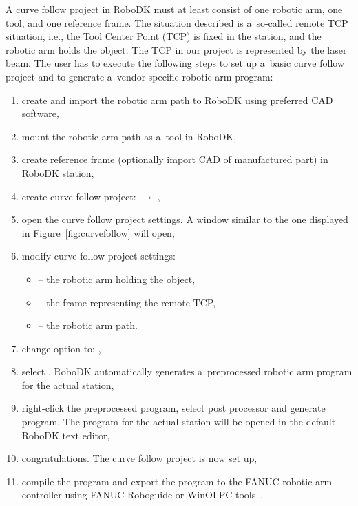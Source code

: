 A curve follow project in RoboDK must at least consist of one robotic arm, one tool, and one reference frame. The situation described is a~so-called remote TCP situation, i.e., the Tool Center Point (TCP) is fixed in the station, and the robotic arm holds the object. The TCP in our project is represented by the laser beam. 
The user has to execute the following steps to set up a~basic curve follow project and to generate a~vendor-specific robotic arm program: 

\begin{enumerate}

\item create and import the robotic arm path to RoboDK using preferred CAD software,

\item mount the robotic arm path as a~tool in RoboDK,

\item create reference frame (optionally import CAD of manufactured part) in RoboDK station, 

\item create curve follow project:  $\rightarrow$ ,

\item open the curve follow project settings. A window similar to the one displayed in Figure~\ref{fig:curvefollow} will open, 

\item modify curve follow project settings:

    \begin{itemize}

        \item {} -- the robotic arm holding the object,
        \item {} -- the frame representing the remote TCP,
        \item {} -- the robotic arm path.
        
    \end{itemize}
    
\item change  option to: ,

\item select . RoboDK automatically generates a~preprocessed robotic arm program for the actual station,

\item right-click the preprocessed program, select post processor and generate program. The  program for the actual station will be opened in the default RoboDK text editor,

\item congratulations. The curve follow project is now set up,

\item compile the program and export the program to the FANUC robotic arm controller using FANUC Roboguide or WinOLPC tools~\cite{curvefollow}.


    
\end{enumerate}

